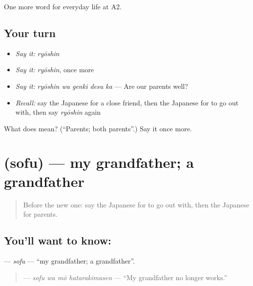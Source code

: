 \begin{grammarlens}[title={What you've built}]
One more word for everyday life at A2.
\end{grammarlens}

\subsection*{Your turn}
\begin{itemize}
\raggedright
  \item \emph{Say it:} \emph{ryōshin}
  \item \emph{Say it:} \emph{ryōshin}, once more
  \item \emph{Say it:} \emph{ryōshin wa genki desu ka} — Are our parents well?
  \item \emph{Recall:} say the Japanese for a close friend, then the Japanese for to go out with, then say \emph{ryōshin} again
\end{itemize}

\begin{tcolorbox}[breakable,colback=teal!4,colframe=teal!35!black,title={Before you move on}]
What does  mean? (\textquotedblleft{}Parents; both parents\textquotedblright{}.) Say it once more.
\end{tcolorbox}
\section[\texorpdfstring{\ja{そふ} (sofu)}{そふ (sofu)}]{ (sofu) — my grandfather; a grandfather}

\label{lesson:JA-C243-sofu}



\begin{quote}
Before the new one: say the Japanese for to go out with, then the Japanese for parents.
\end{quote}

\subsection*{You'll want to know: }
\textbf{} — \emph{sofu} — \textquotedblleft{}my grandfather; a grandfather\textquotedblright{}.

\begin{quote}
\textbf{  } — \emph{sofu wa mō hatarakimasen} — \textquotedblleft{}My grandfather no longer works.\textquotedblright{}
\end{quote}

